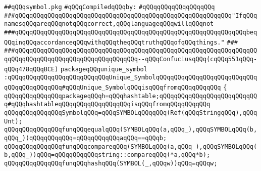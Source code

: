 \label{src/lib/compiler/back/low/tools/line-number-db/symbol.pkg}
\verb|##qQQqsymbol.pkg|\newline
\newline
\verb|#qQQqCompiledqQQqby:|\newline
\verb|#qQQqqQQqqQQqqQQqqQQq|\newline
\newline
\verb|###qQQqqQQqqQQqqQQqqQQqqQQqqQQqqQQqqQQqqQQqqQQqqQQqqQQqqQQqqQQq"IfqQQqnamesqQQqareqQQqnotqQQqcorrect,qQQqlanguageqQQqwillqQQqnot|\newline
\verb|###qQQqqQQqqQQqqQQqqQQqqQQqqQQqqQQqqQQqqQQqqQQqqQQqqQQqqQQqqQQqqQQqbeqQQqinqQQqaccordanceqQQqwithqQQqtheqQQqtruthqQQqofqQQqthings."|\newline
\verb|###|\newline
\verb|###qQQqqQQqqQQqqQQqqQQqqQQqqQQqqQQqqQQqqQQqqQQqqQQqqQQqqQQqqQQqqQQqqQQqqQQqqQQqqQQqqQQqqQQqqQQqqQQqqQQqqQQq--qQQqConfuciusqQQq(cqQQq551qQQq-qQQq478qQQqBCE)|\newline
\newline
\newline
\newline
\verb|packageqQQqunique_symbol|\newline
\verb|:qQQqqQQqqQQqqQQqqQQqqQQqqQQqUnique_SymbolqQQqqQQqqQQqqQQqqQQqqQQqqQQqqQQqqQQqqQQqqQQq#qQQqUnique_SymbolqQQqisqQQqfromqQQqqQQqqQQq|\newline
\verb|{|\newline
\verb|qQQqqQQqqQQqqQQqpackageqQQqh=qQQqhashtable;qQQqqQQqqQQqqQQqqQQqqQQqqQQq#qQQqhashtableqQQqqQQqqQQqqQQqqQQqisqQQqfromqQQqqQQqqQQq|\newline
\newline
\verb|qQQqqQQqqQQqqQQqSymbolqQQq=qQQqSYMBOLqQQqqQQq(Ref(qQQqStringqQQq),qQQqUnt);|\newline
\newline
\verb|qQQqqQQqqQQqqQQqfunqQQqequalqQQq(SYMBOLqQQq(a,qQQq_),qQQqSYMBOLqQQq(b,qQQq_))qQQqqQQqqQQq=qQQqqQQqqQQqaqQQq==qQQqb;|\newline
\verb|qQQqqQQqqQQqqQQqfunqQQqcompareqQQq(SYMBOLqQQq(a,qQQq_),qQQqSYMBOLqQQq(b,qQQq_))qQQq=qQQqqQQqqQQqstring::compareqQQq(*a,qQQq*b);|\newline
\verb|qQQqqQQqqQQqqQQqfunqQQqhashqQQq(SYMBOL(_,qQQqw))qQQq=qQQqw;|\newline

